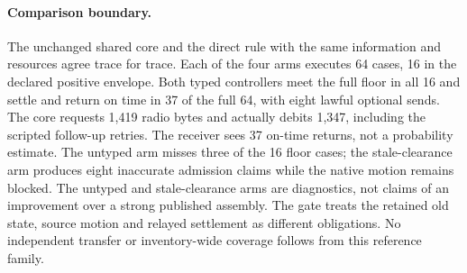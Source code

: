 \documentclass{article}
\begin{document}
\paragraph{Comparison boundary.}
The unchanged shared core and the direct rule with the same
information and resources agree trace for trace. Each of the four
arms executes 64 cases, 16 in the declared positive envelope. Both
typed controllers meet the full floor in all 16 and settle and return
on time in 37 of the full 64, with eight lawful optional sends. The
core requests 1,419 radio bytes and actually debits 1,347, including
the scripted follow-up retries. The receiver sees 37 on-time returns,
not a probability estimate. The untyped arm misses three of the
16 floor cases; the stale-clearance arm produces eight inaccurate
admission claims while the native motion remains blocked. The untyped and
stale-clearance arms are diagnostics, not claims of an improvement
over a strong published assembly. The gate treats the retained
old state, source motion and relayed settlement as different
obligations. No independent transfer or inventory-wide coverage
follows from this reference family.
\end{document}
